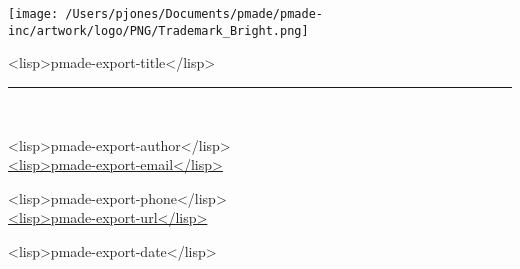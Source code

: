 \documentclass[12pt,titlepage]{article}
\begin{document}
\begin{titlepage}
\begin{center}

\texttt{[image: /Users/pjones/Documents/pmade/pmade-inc/artwork/logo/PNG/Trademark\_Bright.png]}\\[1cm]

\begin{huge}
<lisp>pmade-export-title</lisp>
\par
\end{huge}

\rule{\linewidth}{0.5mm} \\[1.5cm]

\begin{minipage}{0.4\textwidth}
\begin{flushleft} \large
<lisp>pmade-export-author</lisp>\\
\href{mailto:<lisp>pmade-export-email</lisp>}{<lisp>pmade-export-email</lisp>}
\end{flushleft}
\end{minipage}
\begin{minipage}{0.4\textwidth}
\begin{flushright} \large
<lisp>pmade-export-phone</lisp>\\
\url{<lisp>pmade-export-url</lisp>}
\end{flushright}
\end{minipage}

\vfill
{\large <lisp>pmade-export-date</lisp>}

\end{center}
\end{titlepage}

\tableofcontents
\newpage
\end{document}
